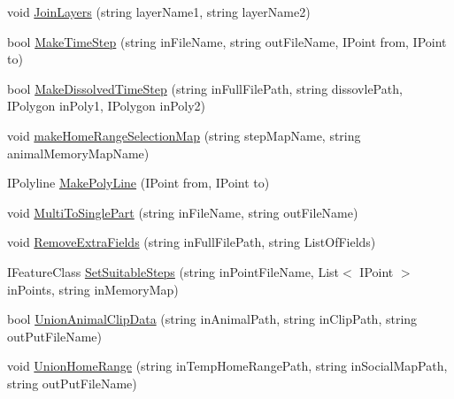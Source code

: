 \begin{DoxyCompactItemize}
\item 
void \hyperlink{class_s_e_a_r_c_h_1_1_data_manipulator_a05d9b0670cf10fbe3ea6f8abc15c5518}{Join\-Layers} (string layer\-Name1, string layer\-Name2)
\item 
bool \hyperlink{class_s_e_a_r_c_h_1_1_data_manipulator_ad0e17c3827e778686a07b3389f3578f2}{Make\-Time\-Step} (string in\-File\-Name, string out\-File\-Name, I\-Point from, I\-Point to)
\item 
bool \hyperlink{class_s_e_a_r_c_h_1_1_data_manipulator_a161fb3d98335b7c221e41ec5dea167fb}{Make\-Dissolved\-Time\-Step} (string in\-Full\-File\-Path, string dissovle\-Path, I\-Polygon in\-Poly1, I\-Polygon in\-Poly2)
\item 
void \hyperlink{class_s_e_a_r_c_h_1_1_data_manipulator_a6d8318737bc98a773b11520c09e7c686}{make\-Home\-Range\-Selection\-Map} (string step\-Map\-Name, string animal\-Memory\-Map\-Name)
\item 
I\-Polyline \hyperlink{class_s_e_a_r_c_h_1_1_data_manipulator_a1ac31ad7044d93328664940f878f524b}{Make\-Poly\-Line} (I\-Point from, I\-Point to)
\item 
void \hyperlink{class_s_e_a_r_c_h_1_1_data_manipulator_af9395181eb8f8b31b9c24ff5a5b4bb26}{Multi\-To\-Single\-Part} (string in\-File\-Name, string out\-File\-Name)
\item 
void \hyperlink{class_s_e_a_r_c_h_1_1_data_manipulator_a08e359c8110275e7b4b56baac9af6cff}{Remove\-Extra\-Fields} (string in\-Full\-File\-Path, string List\-Of\-Fields)
\item 
I\-Feature\-Class \hyperlink{class_s_e_a_r_c_h_1_1_data_manipulator_abbb229d1c972fed92c2c560c69c050fb}{Set\-Suitable\-Steps} (string in\-Point\-File\-Name, List$<$ I\-Point $>$ in\-Points, string in\-Memory\-Map)
\item 
bool \hyperlink{class_s_e_a_r_c_h_1_1_data_manipulator_ae9ea4720dd568b2916b65a4a08cdfac5}{Union\-Animal\-Clip\-Data} (string in\-Animal\-Path, string in\-Clip\-Path, string out\-Put\-File\-Name)
\item 
void \hyperlink{class_s_e_a_r_c_h_1_1_data_manipulator_adda1d4220cd5a6ecef7185d0665ec48b}{Union\-Home\-Range} (string in\-Temp\-Home\-Range\-Path, string in\-Social\-Map\-Path, string out\-Put\-File\-Name)
\end{DoxyCompactItemize}


